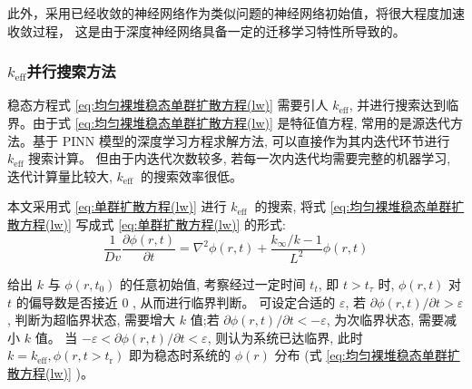 \documentclass{Sichuan Normal University}
\begin{document}
此外，采用已经收敛的神经网络作为类似问题的神经网络初始值，将很大程度加速收敛过程， 这是由于深度神经网络具备一定的迁移学习特性所导致的。

\subsubsection{$k_{\text{eff}}$并行搜索方法}
稳态方程式 \eqref{eq:均匀裸堆稳态单群扩散方程(lw)} 需要引人 $k_{\mathrm{eff}}$, 并进行搜索达到临界。由于式 \eqref{eq:均匀裸堆稳态单群扩散方程(lw)} 是特征值方程, 常用的是源迭代方法。基于 PINN 模型的深度学习方程求解方法, 可以直接作为其内迭代环节进行 $k_{\mathrm{eff}}$ 搜索计算。
但由于内迭代次数较多, 若每一次内迭代均需要完整的机器学习, 迭代计算量比较大, $k_{\text {eff }}$ 的搜索效率很低。

本文采用式 \eqref{eq:单群扩散方程(lw)} 进行 $k_{\text {eff }}$ 的搜索, 将式 \eqref{eq:均匀裸堆稳态单群扩散方程(lw)} 写成式 \eqref{eq:单群扩散方程(lw)} 的形式:
\begin{equation}
    \frac{1}{D v} \frac{\partial \phi(r, t)}{\partial t}=\nabla^2 \phi(r, t)+\frac{k_{\infty} / k-1}{L^2} \phi(r, t)
\label{eq:单群扩散方程(lw)2}
\end{equation}

给出 $k$ 与 $\phi\left(r, t_0\right)$ 的任意初始值, 考察经过一定时间 $t_t$, 即 $t>t_\tau$ 时, $\phi(r, t)$ 对 $t$ 的偏导数是否接近 0 , 从而进行临界判断。
可设定合适的 $\varepsilon$, 若 $\partial \phi(r, t) / \partial t>\varepsilon$, 判断为超临界状态, 需要增大 $k$ 值;若 $\partial \phi(r, t) / \partial t<-\varepsilon$, 为次临界状态, 需要减小 $k$ 值。
当 $-\varepsilon<\partial \phi(r, t) / \partial t<\varepsilon$, 则认为系统已达临界, 此时 $k=k_{\mathrm{eff}}, \phi\left(r, t>t_{\mathrm{r}}\right)$ 即为稳态时系统的 $\phi(r)$ 分布 (式 \eqref{eq:均匀裸堆稳态单群扩散方程(lw)} )。
\end{document}
